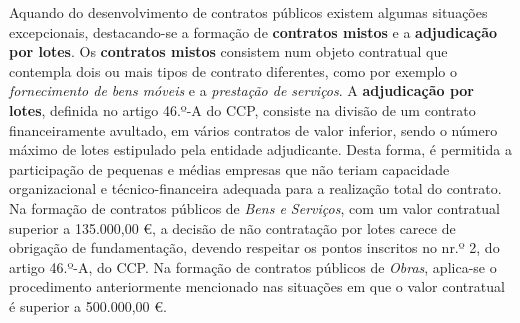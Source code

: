 Aquando do desenvolvimento de contratos públicos existem algumas situações excepcionais, destacando-se a formação de \textbf{contratos mistos} e a \textbf{adjudicação por lotes}.
Os \textbf{contratos mistos} consistem num objeto contratual que contempla dois ou mais tipos de contrato diferentes\cite{mistos}, como por exemplo o \textit{fornecimento de bens móveis} e a \textit{prestação de serviços}.
A \textbf{adjudicação por lotes}, definida no artigo 46.º-A do CCP, consiste na divisão de um contrato financeiramente avultado, em vários contratos de valor inferior, sendo o número máximo de lotes estipulado pela entidade adjudicante. Desta forma, é permitida a participação de pequenas e médias empresas que não teriam capacidade organizacional e técnico-financeira adequada para a realização total do contrato. Na formação de contratos públicos de \textit{Bens e Serviços}, com um valor contratual superior a 135.000,00 €, a decisão de não contratação por lotes carece de obrigação de fundamentação, devendo respeitar os pontos inscritos no nr.º 2, do artigo 46.º-A, do CCP. Na formação de contratos públicos de \textit{Obras}, aplica-se o procedimento anteriormente mencionado nas situações em que o valor contratual é superior a 500.000,00 €. 


